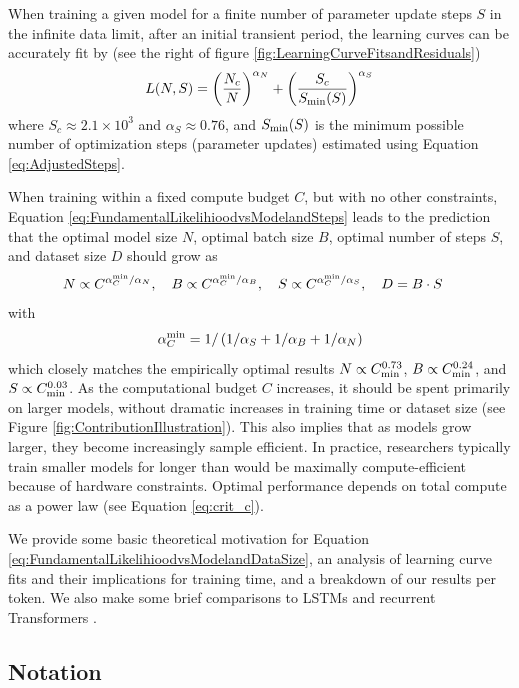 \documentclass[english]{article}
\newcommand{\be}{\begin{equation}}
\newcommand{\ee}{\end{equation}}
\begin{document}
When training a given model for a finite number of parameter update steps $S$ in the infinite data limit, after an initial transient period, the learning curves can be accurately fit by  (see the right of figure \ref{fig:LearningCurveFitsandResiduals})
\be
\label{eq:FundamentalLikelihioodvsModelandSteps}
L(N, S) = \left( \frac{N_c}{N} \right)^{\alpha_N}  + \left( \frac{S_c }{S_{\rm min}(S)} \right)^{\alpha_S}
\ee
where $S_c \approx 2.1 \times 10^3$ and $\alpha_S \approx 0.76$, and $S_{\rm min}(S)$ is the minimum possible number of optimization steps (parameter updates)
estimated  using Equation \eqref{eq:AdjustedSteps}.

When training within a fixed compute budget $C$, but with no other constraints, Equation \eqref{eq:FundamentalLikelihioodvsModelandSteps} leads to the prediction that the optimal model size $N$, optimal batch size $B$, optimal number of steps $S$, and dataset size $D$ should grow as 
\be
\label{eq:OptimalModelSizeTrainingTimevsCompute}
N \propto C^{\alpha_{C}^{\rm min} /\alpha_{N}}, \quad
B \propto C^{\alpha_C^{\rm min} / \alpha_B}, \quad
S \propto C^{\alpha_C^{\rm min} / \alpha_S}, \quad
D = B\cdot S \quad
\ee
with
\be
\alpha_{C}^{\rm min} = 1/\left(1/\alpha_{S}+1/\alpha_{B}+1/\alpha_{N}\right) 
\ee
which closely matches the empirically optimal results $N \propto C_{\rm min}^{0.73}$, $B \propto C_{\rm min}^{0.24}$, and $S \propto C_{\rm min}^{0.03}$.  As the computational budget $C$ increases, it should be spent primarily on larger models, without dramatic increases in training time or dataset size (see Figure \ref{fig:ContributionIllustration}).  This also implies that as models grow larger, they  become increasingly sample efficient.  In practice, researchers typically train  smaller models for  longer than would be maximally compute-efficient because of  hardware constraints.
Optimal performance depends on total compute as a power law (see Equation \eqref{eq:crit_c}).

We  provide some basic theoretical motivation for Equation \eqref{eq:FundamentalLikelihioodvsModelandDataSize}, an analysis of learning curve fits and their implications for training time, and a breakdown of our results per token.  We also make some brief comparisons to LSTMs and recurrent Transformers \cite{DBLP:journals/corr/abs-1807-03819}.


\subsection{Notation}
\end{document}
